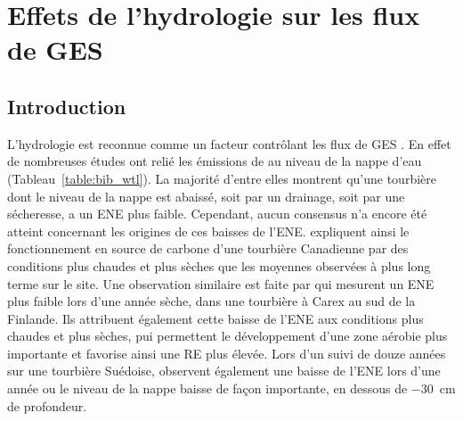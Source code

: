\singlespacing
\chapter{Effets de l'hydrologie sur les flux de GES}
\label{ch:4}

\minitoc

\newpage
\doublespacing
\section{Introduction}


L'hydrologie est reconnue comme un facteur contrôlant les flux de GES \citep{blodau2002}.
En effet de nombreuses études ont relié les émissions de \coo au niveau de la nappe d'eau (Tableau~\ref{table:bib_wtl}).
La majorité d'entre elles montrent qu'une tourbière dont le niveau de la nappe est abaissé, soit par un drainage, soit par une sécheresse, a un ENE plus faible.
Cependant, aucun consensus n'a encore été atteint concernant les origines de ces baisses de l'ENE.
\citet{strack2013} expliquent ainsi le fonctionnement en source de carbone d'une tourbière Canadienne par des conditions plus chaudes et plus sèches que les moyennes observées à plus long terme sur le site.
Une observation similaire est faite par \citet{aurela2007} qui mesurent un ENE plus faible lors d'une année sèche, dans une tourbière à Carex au sud de la Finlande.
Ils attribuent également cette baisse de l'ENE aux conditions plus chaudes et plus sèches, pui permettent le développement d'une zone aérobie plus importante et favorise ainsi une RE plus élevée.
Lors d'un suivi de douze années sur une tourbière Suédoise, \citet{peichl2014} observent également une baisse de l'ENE lors d'une année ou le niveau de la nappe baisse de façon importante, en dessous de \SI{-30}{\centi\metre} de profondeur.

